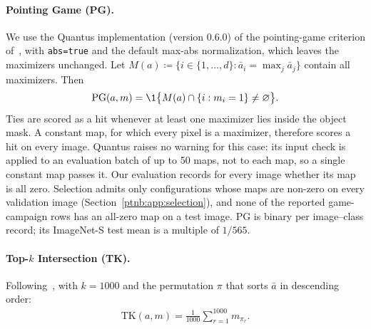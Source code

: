 \paragraph{Pointing Game (PG).} We use the Quantus implementation (version 0.6.0) of the pointing-game criterion of~\textcite{Zhang2018pointinggame}, with \texttt{abs=true} and the default max-abs normalization, which leaves the maximizers unchanged. Let $M(a) \coloneqq \{i \in \{1, \dots, d\} :
    \bar{a}_i = \max_j \bar{a}_j\}$ contain all maximizers. Then
\begin{align}
    \text{PG}(a, m) = \1\bigl\{M(a) \cap \{i : m_i = 1\} \neq \varnothing\bigr\}.
\end{align}
Ties are scored as a hit whenever at least one maximizer lies inside the object mask. A constant map, for which every pixel is a maximizer, therefore scores a hit on every image. Quantus raises no warning for this case: its input check is applied to an evaluation batch of up to 50 maps, not to each map, so a single constant map passes it. Our evaluation records for every image whether its map is all zero. Selection admits only configurations whose maps are non-zero on every validation image (Section~\ref{ptnb:app:selection}), and none of the reported game-campaign rows has an all-zero map on a test image. PG is binary per image--class record; its ImageNet-S test mean is a multiple of $1/565$.

\paragraph{Top-$k$ Intersection (TK).} Following~\textcite{Theiner2021}, with $k = 1000$ and the permutation $\pi$ that sorts
$\bar{a}$ in descending order:
\begin{align}
    \text{TK}(a, m) = \frac{1}{1000} \sum_{r=1}^{1000} m_{\pi_r}.
\end{align}


